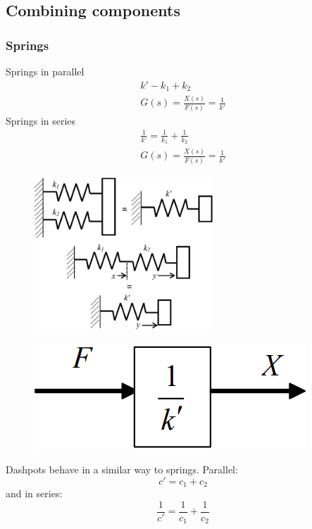 \documentclass[class=report, crop=false, 12pt,a4paper, tikz, border=4mm]{standalone}
\begin{document}
\subsection{Combining components}
\subsubsection{Springs}
Springs in parallel
\begin{gather}
  k' - k_1 + k_2\\
  G(s) = \frac{X(s)}{F(s)} = \frac{1}{k'}
\end{gather}
Springs in series
\begin{gather}
  \frac{1}{k'} = \frac{1}{k_1} + \frac{1}{k_2}\\
  G(s) = \frac{X(s)}{F(s)} = \frac{1}{k'}
\end{gather}
\begin{figure}[H]
  \centering
  \includegraphics[width = 0.6\textwidth]{../img/diagram4.png}
\end{figure}
\begin{figure}[H]
  \centering
  \includegraphics[width = 0.6 \textwidth]{../img/blockdiagram15.png}
\end{figure}
Dashpots behave in a similar way to springs. Parallel:
\begin{equation}
  c' = c_1 + c_2
\end{equation}
and in series:
\begin{equation}
  \frac{1}{c'} = \frac{1}{c_1} + \frac{1}{c_2}
\end{equation}
\end{document}
